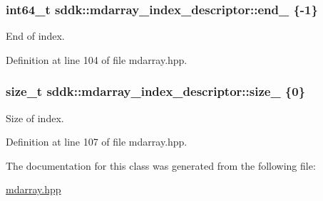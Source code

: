 \subsubsection[{end\+\_\+}]{\setlength{\rightskip}{0pt plus 5cm}int64\+\_\+t sddk\+::mdarray\+\_\+index\+\_\+descriptor\+::end\+\_\+ \{-\/1\}\hspace{0.3cm}{\ttfamily [private]}}\label{classsddk_1_1mdarray__index__descriptor_ad8579727937db1f90ac0b7a4ec820ed2}


End of index. 



Definition at line 104 of file mdarray.\+hpp.

\hypertarget{classsddk_1_1mdarray__index__descriptor_a725ee21beb6f1a31b735afc14316ad99}{}
\subsubsection[{size\+\_\+}]{\setlength{\rightskip}{0pt plus 5cm}size\+\_\+t sddk\+::mdarray\+\_\+index\+\_\+descriptor\+::size\+\_\+ \{0\}\hspace{0.3cm}{\ttfamily [private]}}\label{classsddk_1_1mdarray__index__descriptor_a725ee21beb6f1a31b735afc14316ad99}


Size of index. 



Definition at line 107 of file mdarray.\+hpp.



The documentation for this class was generated from the following file\+:\begin{DoxyCompactItemize}
\item 
\hyperlink{mdarray_8hpp}{mdarray.\+hpp}\end{DoxyCompactItemize}

